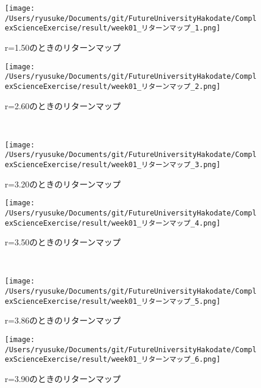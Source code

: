 \documentclass[a4j]{jsarticle}
\begin{document}
 \begin{figure}[htbp]
  \begin{minipage}{0.5\hsize}
   \begin{center}
    \texttt{[image: /Users/ryusuke/Documents/git/FutureUniversityHakodate/ComplexScienceExercise/result/week01\_リターンマップ\_1.png]}
   \end{center}
   \caption{r=1.50のときのリターンマップ}
   \label{fig:seven}
  \end{minipage}
  \begin{minipage}{0.5\hsize}
   \begin{center}
    \texttt{[image: /Users/ryusuke/Documents/git/FutureUniversityHakodate/ComplexScienceExercise/result/week01\_リターンマップ\_2.png]}
   \end{center}
   \caption{r=2.60のときのリターンマップ}
   \label{fig:eight}
  \end{minipage} \\
  \begin{minipage}{0.5\hsize}
   \begin{center}
    \texttt{[image: /Users/ryusuke/Documents/git/FutureUniversityHakodate/ComplexScienceExercise/result/week01\_リターンマップ\_3.png]}
   \end{center}
   \caption{r=3.20のときのリターンマップ}
   \label{fig:nine}
  \end{minipage}
  \begin{minipage}{0.5\hsize}
   \begin{center}
    \texttt{[image: /Users/ryusuke/Documents/git/FutureUniversityHakodate/ComplexScienceExercise/result/week01\_リターンマップ\_4.png]}
   \end{center}
   \caption{r=3.50のときのリターンマップ}
   \label{fig:ten}
  \end{minipage} \\
  \begin{minipage}{0.5\hsize}
   \begin{center}
    \texttt{[image: /Users/ryusuke/Documents/git/FutureUniversityHakodate/ComplexScienceExercise/result/week01\_リターンマップ\_5.png]}
   \end{center}
   \caption{r=3.86のときのリターンマップ}
   \label{fig:eleven}
  \end{minipage}
  \begin{minipage}{0.5\hsize}
   \begin{center}
    \texttt{[image: /Users/ryusuke/Documents/git/FutureUniversityHakodate/ComplexScienceExercise/result/week01\_リターンマップ\_6.png]}
   \end{center}
   \caption{r=3.90のときのリターンマップ}
   \label{fig:twelve}
  \end{minipage}
 \end{figure}
\end{document}
